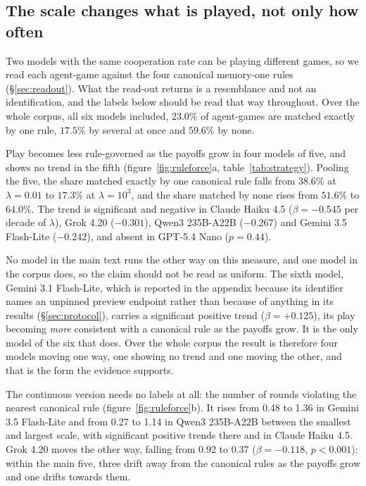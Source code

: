 \documentclass[openacc]{rsproca_new}
\newcommand{\lam}{\lambda}
\begin{document}
\subsection{The scale changes what is played, not only how often}\label{sec:llm_strategies}

Two models with the same cooperation rate can be playing different games, so we
read each agent-game against the four canonical memory-one rules
(\S\ref{sec:readout}). What the read-out returns is a resemblance and not an
identification, and the labels below should be read that way throughout. Over
the whole corpus, all six models included, $23.0\%$ of agent-games are matched
exactly by one rule, $17.5\%$ by several at once and $59.6\%$ by none.

Play becomes less rule-governed as the payoffs grow in four models of five, and
shows no trend in the fifth (figure~\ref{fig:ruleforce}a,
table~\ref{tab:strategy}). Pooling the five, the share matched exactly by one
canonical rule falls from $38.6\%$ at $\lam = 0.01$ to $17.3\%$ at
$\lam = 10^{3}$, and the share matched by none rises from $51.6\%$ to $64.0\%$.
The trend is significant and negative in Claude Haiku 4.5 ($\beta = -0.545$ per
decade of $\lam$), Grok 4.20 ($-0.301$), Qwen3 235B-A22B ($-0.267$) and Gemini
3.5 Flash-Lite ($-0.242$), and absent in GPT-5.4 Nano ($p = 0.44$).

No model in the main text runs the other way on this measure, and one model in
the corpus does, so the claim should not be read as uniform. The sixth model,
Gemini 3.1 Flash-Lite, which is reported in the appendix because its identifier
names an unpinned preview endpoint rather than because of anything in its
results (\S\ref{sec:protocol}), carries a significant positive trend
($\beta = +0.125$), its play becoming \emph{more} consistent with a canonical
rule as the payoffs grow. It is the only model of the six that does. Over the
whole corpus the result is therefore four models moving one way, one showing no
trend and one moving the other, and that is the form the evidence supports.

The continuous version needs no labels at all: the number of rounds violating
the nearest canonical rule (figure~\ref{fig:ruleforce}b). It rises from 0.48 to
1.36 in Gemini 3.5 Flash-Lite and from 0.27 to 1.14 in Qwen3 235B-A22B between
the smallest and largest scale, with significant positive trends there and in
Claude Haiku 4.5. Grok 4.20 moves the other way, falling from 0.92 to 0.37
($\beta = -0.118$, $p < 0.001$): within the main five, three drift away from
the canonical rules as the payoffs grow and one drifts towards them.
\end{document}
